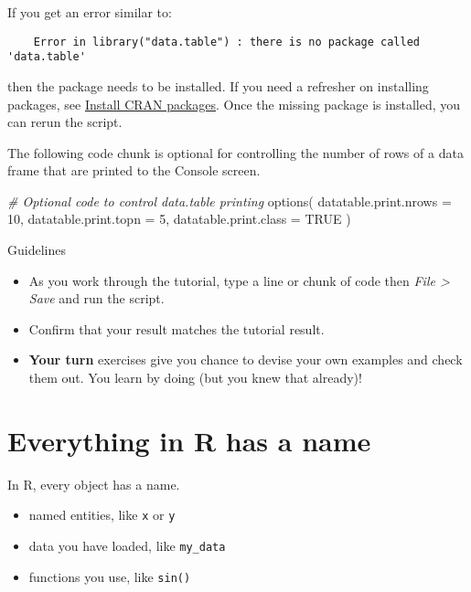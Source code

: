 \documentclass[
]{book}
\newenvironment{Shaded}{\begin{snugshade}}{\end{snugshade}}
\newcommand{\AttributeTok}[1]{\textcolor[rgb]{0.77,0.63,0.00}{#1}}
\newcommand{\CommentTok}[1]{\textcolor[rgb]{0.56,0.35,0.01}{\textit{#1}}}
\newcommand{\ConstantTok}[1]{\textcolor[rgb]{0.00,0.00,0.00}{#1}}
\newcommand{\DecValTok}[1]{\textcolor[rgb]{0.00,0.00,0.81}{#1}}
\newcommand{\FunctionTok}[1]{\textcolor[rgb]{0.00,0.00,0.00}{#1}}
\newcommand{\NormalTok}[1]{#1}
\providecommand{\tightlist}{%
  \setlength{\itemsep}{0pt}\setlength{\parskip}{0pt}}
\begin{document}
If you get an error similar to:

\begin{verbatim}
    Error in library("data.table") : there is no package called 'data.table'
\end{verbatim}

then the package needs to be installed. If you need a refresher on installing packages, see \protect\hyperlink{install-cran-packages}{Install CRAN packages}. Once the missing package is installed, you can rerun the script.

The following code chunk is optional for controlling the number of rows of a data frame that are printed to the Console screen.

\begin{Shaded}
\begin{Highlighting}[]
\CommentTok{\# Optional code to control data.table printing}
\FunctionTok{options}\NormalTok{(}
  \AttributeTok{datatable.print.nrows =} \DecValTok{10}\NormalTok{,}
  \AttributeTok{datatable.print.topn =} \DecValTok{5}\NormalTok{,}
  \AttributeTok{datatable.print.class =} \ConstantTok{TRUE}
\NormalTok{)}
\end{Highlighting}
\end{Shaded}

Guidelines

\begin{itemize}
\tightlist
\item
  As you work through the tutorial, type a line or chunk of code then \emph{File \textgreater{} Save} and run the script.\\
\item
  Confirm that your result matches the tutorial result.\\
\item
  \textbf{Your turn} exercises give you chance to devise your own examples and check them out. You learn by doing (but you knew that already)!
\end{itemize}

\hypertarget{everything-in-r-has-a-name}{%
\section{Everything in R has a name}\label{everything-in-r-has-a-name}}

In R, every object has a name.

\begin{itemize}
\tightlist
\item
  named entities, like \texttt{x} or \texttt{y}\\
\item
  data you have loaded, like \texttt{my\_data}
\item
  functions you use, like \texttt{sin()}
\end{itemize}
\end{document}
